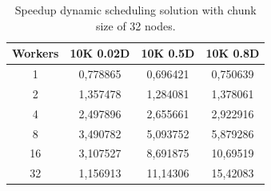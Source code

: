 \begin{table}[htb!]
\centering
\begin{tabular}{|c|c|c|c|}
\hline
Workers & 10K 0.02D & 10K 0.5D & 10K 0.8D \\ \hline
1       & 0,778865  & 0,696421 & 0,750639 \\ \hline
2       & 1,357478  & 1,284081 & 1,378061 \\ \hline
4       & 2,497896  & 2,655661 & 2,922916 \\ \hline
8       & 3,490782  & 5,093752 & 5,879286 \\ \hline
16      & 3,107527  & 8,691875 & 10,69519 \\ \hline
32      & 1,156913  & 11,14306 & 15,42083 \\ \hline
\end{tabular}
\caption{Speedup dynamic scheduling solution with chunk size of 32 nodes.}
\label{table:spup_dy}
\end{table}
\FloatBarrier